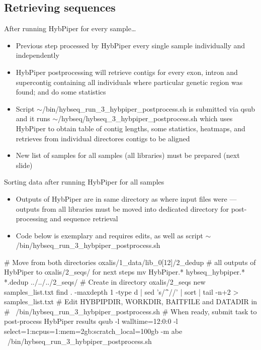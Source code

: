 \documentclass[compress, ucs, xelatex, 11pt, xcolor=x11names, aspectratio=169,
	hyperref={
		bookmarks=true,
		unicode=true,
		colorlinks=true,
		pdftitle={HybSeq course},
		plainpages=false,
		pdfauthor={Vojtech Zeisek},
		pdfsubject={Practical processing of HybSeq target enrichment sequencing data on computing grids like MetaCentrum},
		pdfcreator={XeLaTeX},
		pdfkeywords={BASH, command line, GNU, HybSeq, Linux, MetaCentrum, sequencing shell, target enrichment},
		linkcolor=Turquoise4, %
		anchorcolor=DodgerBlue4, %
		citecolor=DodgerBlue4, %
		filecolor=DodgerBlue4, %
		menucolor=Tan4, %
		urlcolor=DarkOliveGreen4, %
		pdftex},
	url={hyphens, lowtilde} %
	]{beamer}
\renewcommand{\texttt}[1]{\colorbox{Cornsilk2}{{\ttfamily #1}}}
\renewcommand{\alert}[1]{\textcolor{OrangeRed3}{#1}}
\begin{document}
\subsection{Retrieving sequences}

\begin{frame}{After running HybPiper for every sample\ldots}
	\begin{itemize}
		\item Previous step processed by HybPiper every single sample individually and independently
		\item HybPiper postprocessing will retrieve contigs for every exon, intron and supercontig containing all individuals where particular genetic region was found; and do some statistics
		\item Script \texttt{$\sim$/bin/hybseq\_run\_3\_hybpiper\_postprocess.sh} is submitted via \texttt{qsub} and it runs \texttt{$\sim$/hybseq/hybseq\_3\_hybpiper\_postprocess.sh} which uses HybPiper to obtain table of contig lengths, some statistics, heatmaps, and retrieves from individual directores contigs to be aligned
		\item New list of samples for all samples (all libraries) must be prepared (next slide)
	\end{itemize}
\end{frame}

\begin{frame}[fragile]{Sorting data after running HybPiper for all samples}
	\begin{itemize}
		\item Outputs of HybPiper are in same directory as where input files were --- outputs from all libraries must be moved into dedicated directory for post-processing and sequence retrieval
		\item \alert{Code below is exemplary and requires edits, as well as script \texttt{$\sim$/bin/hybseq\_run\_3\_hybpiper\_postprocess.sh}}
	\end{itemize}
	\begin{bashcode}
    # Move from both directories oxalis/1_data/lib_0[12]/2_dedup
    # all outputs of HybPiper to oxalis/2_seqs/ for next steps
    mv HybPiper.* hybseq_hybpiper.* *.dedup ../../../2_seqs/
    # Create in directory oxalis/2_seqs new samples_list.txt
    find . -maxdepth 1 -type d | sed 's/^\.\///' | sort | tail -n+2 >
      samples_list.txt
    # Edit HYBPIPDIR, WORKDIR, BAITFILE and DATADIR in
    # ~/bin/hybseq_run_3_hybpiper_postprocess.sh
    # When ready, submit task to post-process HybPiper results
    qsub -l walltime=12:0:0 -l select=1:ncpus=1:mem=2gb:scratch_local=100gb
       -m abe ~/bin/hybseq_run_3_hybpiper_postprocess.sh
	\end{bashcode}
\end{frame}
\end{document}
